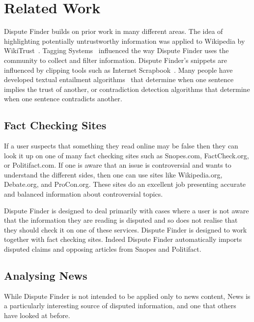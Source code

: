 \documentclass{www2010-submission}
\newcommand{\todo}[1]{}
\begin{document}
\todo{Should we explicitly list what we think are our key contributions?}


\section{Related Work}

Dispute Finder builds on prior work in many different areas. The idea of highlighting potentially untrustworthy information was applied to Wikipedia by WikiTrust~\cite{Adler2008a}. Tagging Systems~\cite{Marlow2006} influenced the way Dispute Finder uses the community to collect and filter information. Dispute Finder's snippets are influenced by clipping tools such as Internet Scrapbook~\cite{Sugiura1998}. Many people have developed textual entailment algorithms~\cite{entail?} that determine when one sentence implies the trust of another, or contradiction detection algorithms that determine when one sentence contradicts another.

\todo{Add more references from the NewsCube paper}

\subsection{Fact Checking Sites}

If a user suspects that something they read online may be false then they can look it up on one of many fact checking sites such as Snopes.com, FactCheck.org, or Politifact.com. If one is aware that an issue is controversial and wants to understand the different sides, then one can use sites like Wikipedia.org, Debate.org, and ProCon.org. These sites do an excellent job presenting accurate and balanced information about controversial topics. 

Dispute Finder is designed to deal primarily with cases where a user is not aware that the information they are reading is disputed and so does not realise that they should check it on one of these services. Dispute Finder is designed to work together with fact checking sites. Indeed Dispute Finder automatically imports disputed claims and opposing articles from Snopes and Politifact.

\subsection{Analysing News}

While Dispute Finder is not intended to be applied only to news content, News is a particularly interesting source of disputed information, and one that others have looked at before. 
\end{document}
